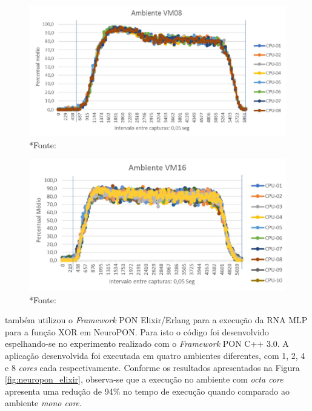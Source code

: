 \begin{figure}[!htb]
  \centering
  \begin{minipage}{.5\textwidth}
    \centering
    \includegraphics[width=\linewidth]{../figures/vm08.png}
    *{Fonte: }
    \label{fig:vm08}
  \end{minipage}%
  \begin{minipage}{.5\textwidth}
    \centering
    \includegraphics[width=\linewidth]{../figures/vm16.png}
    *{Fonte: }
    \label{fig:vm16}
  \end{minipage}
\end{figure}

\FloatBarrier

 também utilizou o \textit{Framework} PON
Elixir/Erlang para a execução da RNA MLP para a função XOR em NeuroPON. Para
isto o código foi desenvolvido espelhando-se no experimento realizado com o
\textit{Framework} PON C++ 3.0. A aplicação desenvolvida foi executada em quatro
ambientes diferentes, com 1, 2, 4 e 8 \textit{cores} cada respectivamente.
Conforme os resultados apresentados na Figura \ref{fig:neuropon_elixir},
observa-se que a execução no ambiente com \textit{octa core} apresenta uma
redução de 94\% no tempo de execução quando comparado ao ambiente \textit{mono
core}. 

